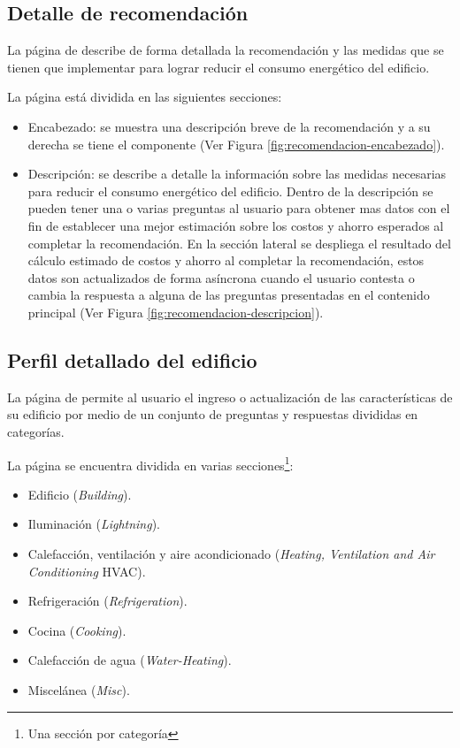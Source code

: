 \subsection{Detalle de recomendación}

La página de  describe de forma detallada la
recomendación y las medidas que se tienen que implementar para lograr reducir
el consumo energético del edificio.

La página está dividida en las siguientes secciones:
\begin{itemize}
\item Encabezado: se muestra una descripción breve de la recomendación y a su
  derecha se tiene el componente  (Ver Figura
  \ref{fig:recomendacion-encabezado}).
\item Descripción: se describe a detalle la información sobre las medidas
  necesarias para reducir el consumo energético del edificio.
  Dentro de la descripción se pueden tener una o varias preguntas al usuario
  para obtener mas datos con el fin de establecer una mejor
  estimación sobre los costos y ahorro esperados al completar la recomendación.
  En la sección lateral se despliega el resultado del cálculo estimado
  de costos y ahorro al completar la recomendación, estos datos son
  actualizados de forma asíncrona cuando el usuario contesta o cambia
  la respuesta a alguna de las preguntas presentadas en el contenido
  principal (Ver Figura \ref{fig:recomendacion-descripcion}).
\end{itemize}

\subsection{Perfil detallado del edificio}

La página de  permite al usuario el ingreso
o actualización de las características de su edificio por medio de un
conjunto de preguntas y respuestas divididas en categorías.

La página se encuentra dividida en varias secciones\footnote{Una sección por
  categoría}:
\begin{itemize}
\item Edificio (\textit{Building}).
\item Iluminación (\textit{Lightning}).
\item Calefacción, ventilación y aire acondicionado (\textit{Heating, Ventilation and Air Conditioning} HVAC).
\item Refrigeración (\textit{Refrigeration}).
\item Cocina (\textit{Cooking}).
\item Calefacción de agua (\textit{Water-Heating}).
\item Miscelánea (\textit{Misc}).
\end{itemize}

